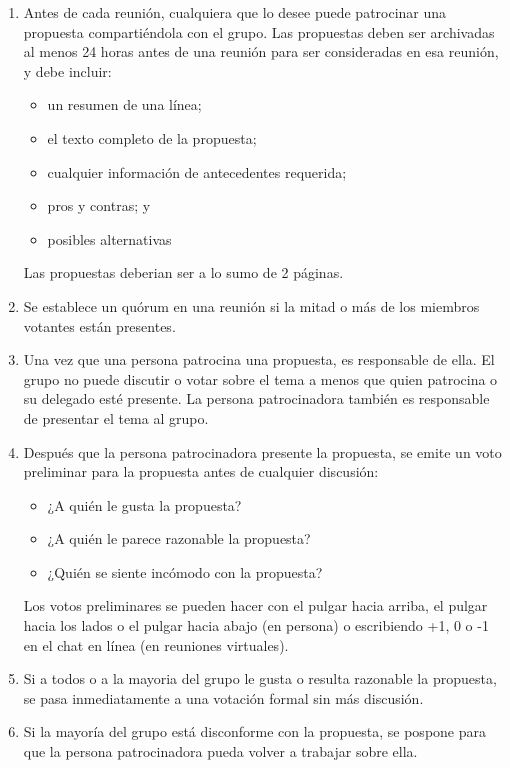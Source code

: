 \begin{enumerate}

\item
  Antes de cada reunión,
  cualquiera que lo desee puede patrocinar una propuesta compartiéndola con el grupo.
  Las propuestas deben ser archivadas al menos 24 horas antes de una reunión para ser consideradas en esa reunión,
  y debe incluir:
  \begin{itemize}
  \item un resumen de una línea;
  \item el texto completo de la propuesta;
  \item cualquier información de antecedentes requerida;
  \item pros y contras; y
  \item posibles alternativas
  \end{itemize}
  Las propuestas deberian ser a lo sumo de 2 páginas.

\item
  Se establece un quórum en una reunión si la mitad o más de los miembros votantes están presentes.

\item
  Una vez que una persona patrocina una propuesta,
  es responsable de ella.
  El grupo no puede discutir o votar sobre el tema a menos que quien patrocina o su delegado esté presente.
  La persona patrocinadora también es responsable de presentar el tema al grupo.

\item
  Después que la persona patrocinadora presente la propuesta,
  se emite un voto preliminar para la propuesta antes de cualquier discusión:
  \begin{itemize}
  \item ¿A quién le gusta la propuesta?
  \item ¿A quién le parece razonable la propuesta?
  \item ¿Quién se siente incómodo con la propuesta?
  \end{itemize}
  Los votos preliminares se pueden hacer con el pulgar hacia arriba, el pulgar hacia los lados o el pulgar hacia abajo (en persona)
  o escribiendo +1, 0 o -1 en el chat en línea (en reuniones virtuales).

\item
  Si a todos o a la mayoria del grupo le gusta o resulta razonable la propuesta,
  se pasa inmediatamente a una votación formal sin más discusión.

\item
  Si la mayoría del grupo está disconforme con la propuesta,
  se pospone para que la persona patrocinadora pueda volver a trabajar sobre ella.


\end{enumerate}

